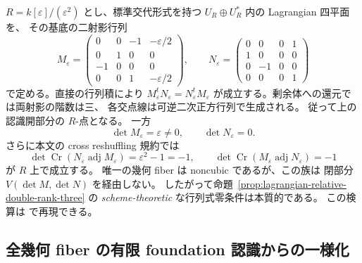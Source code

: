 \begin{example}
\label{ex:lg-nilpotent-transverse-determinant}
$R=k[\varepsilon]/(\varepsilon^2)$ とし、標準交代形式を持つ
$U_R\oplus U_R^*$ 内の Lagrangian 四平面を、
その基底の二射影行列
\[
 M_\varepsilon=
 \begin{pmatrix}
 0&0&-1&-\varepsilon/2\\
 0&1&0&0\\
 -1&0&0&0\\
 0&0&1&-\varepsilon/2
 \end{pmatrix},\qquad
 N_\varepsilon=
 \begin{pmatrix}
 0&0&0&1\\
 1&0&0&0\\
 0&-1&0&0\\
 0&0&0&1
 \end{pmatrix}
\]
で定める。直接の行列積により
$M_\varepsilon^{t}N_\varepsilon=N_\varepsilon^{t}M_\varepsilon$
が成立する。剰余体への還元では両射影の階数は三、
各交点線は可逆二次正方行列で生成される。
従って上の認識開部分の $R$-点となる。
一方
\[
 \det M_\varepsilon=\varepsilon\ne0,\qquad
 \det N_\varepsilon=0.
\]
さらに本文の cross reshuffling 規約では
\[
 \det\operatorname{Cr}(N_\varepsilon\operatorname{adj}M_\varepsilon)
 =\varepsilon^2-1=-1,\qquad
 \det\operatorname{Cr}(M_\varepsilon\operatorname{adj}N_\varepsilon)=-1
\]
が $R$ 上で成立する。
唯一の幾何 fiber は noncubic であるが、この族は
閉部分 $V(\det M,\det N)$ を経由しない。
したがって命題~\ref{prop:lagrangian-relative-double-rank-three} の
\emph{scheme-theoretic} な行列式零条件は本質的である。
この検算は
 で再現できる。
\end{example}

\subsection{全幾何 fiber の有限 foundation 認識からの一様化}


